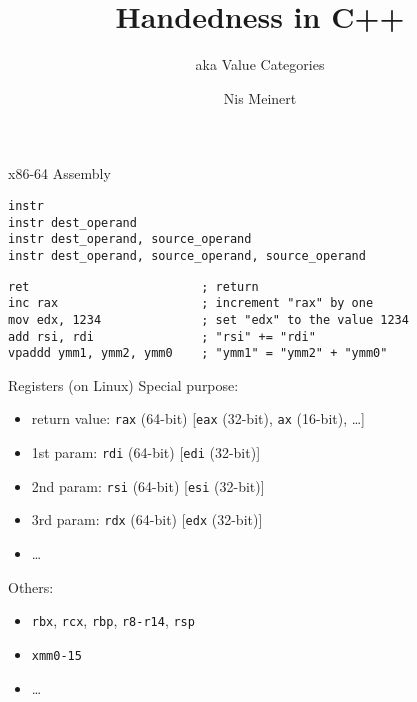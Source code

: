 \documentclass[compress,aspectratio=1610]{beamer}
\title{Handedness in C++}
\subtitle{aka Value Categories}
\institute{iCSC 2019}
\author{Nis Meinert}
\newcommand{\inputlisting}[1]{}
\begin{document}
\maketitle

\begin{frame}[fragile]{x86-64 Assembly}
    \begin{lstlisting}[language={[x86masm]Assembler}]
instr
instr dest_operand
instr dest_operand, source_operand
instr dest_operand, source_operand, source_operand
    \end{lstlisting}

    \begin{lstlisting}[language={[x86masm]Assembler}]
ret                        ; return
inc rax                    ; increment "rax" by one
mov edx, 1234              ; set "edx" to the value 1234
add rsi, rdi               ; "rsi" += "rdi"
vpaddd ymm1, ymm2, ymm0    ; "ymm1" = "ymm2" + "ymm0"
    \end{lstlisting}
\end{frame}

\begin{frame}{Registers (on Linux)}
    Special purpose:
    \begin{itemize}
        \item return value: \texttt{rax} (64-bit) [\texttt{eax} (32-bit), \texttt{ax} (16-bit), \ldots]
        \item 1st param: \texttt{rdi} (64-bit) [\texttt{edi} (32-bit)]
        \item 2nd param: \texttt{rsi} (64-bit) [\texttt{esi} (32-bit)]
        \item 3rd param: \texttt{rdx} (64-bit) [\texttt{edx} (32-bit)]
        \item \ldots
    \end{itemize}

    Others:
    \begin{itemize}
        \item \texttt{rbx}, \texttt{rcx}, \texttt{rbp}, \texttt{r8-r14}, \texttt{rsp}
        \item \texttt{xmm0-15}
        \item \ldots
    \end{itemize}
\end{frame}

\begin{frame}[fragile]
    \begin{columns}[t]
        \begin{column}{.45\textwidth}
            \inputlisting{snippet1}
        \end{column}
        \begin{column}{.45\textwidth}
            Assembler}]{snippet1.asm}
        \end{column}
    \end{columns}
\end{frame}

\begin{frame}[fragile]
    \inputlisting{snippet2}
\end{frame}
\end{document}

